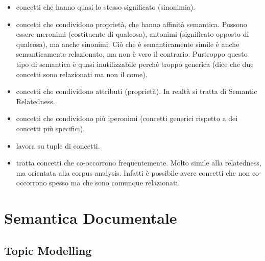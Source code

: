 \begin{itemize}
  \item {} concetti che hanno quasi lo stesso significato (sinonimia). 
  \item {} concetti che condividono proprietà, che hanno affinità semantica. Possono essere meronimi (costituente di qualcosa), antonimi (significato opposto di qualcosa), ma anche sinonimi. Ciò che è semanticamente simile è anche semanticamente relazionato, ma non è vero il contrario. Purtroppo questo tipo di semantica è quasi inutilizzabile perché troppo generica (dice che due concetti sono relazionati ma non il come). 
  \item {} concetti che condividono attributi (proprietà). In realtà si tratta di Semantic Relatedness. 
  \item {} concetti che condividono più iperonimi (concetti generici rispetto a dei concetti più specifici). 
  \item {} lavora su tuple di concetti. 
  \item {} tratta concetti che co-occorrono frequentemente. Molto simile alla relatedness, ma orientata alla corpus analysis. Infatti è possibile avere concetti che non co-occorrono spesso ma che sono comunque relazionati. 
\end{itemize}


\section{Semantica Documentale}


\subsection{Topic Modelling}

